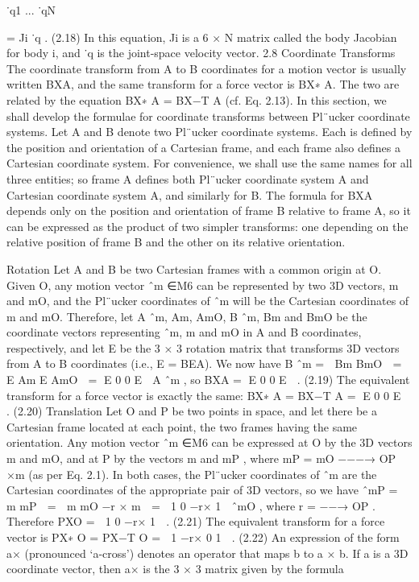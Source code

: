 ˙q1 ... ˙qN

= Ji ˙q . (2.18) In this equation, Ji is a 6 × N matrix called the body Jacobian for body i, and ˙q is the joint-space velocity vector. 2.8 Coordinate Transforms The coordinate transform from A to B coordinates for a motion vector is usually written BXA, and the same transform for a force vector is BX∗ A. The two are related by the equation BX∗ A = BX−T A (cf. Eq. 2.13). In this section, we shall develop the formulae for coordinate transforms between Pl¨ucker coordinate systems. Let A and B denote two Pl¨ucker coordinate systems. Each is defined by the position and orientation of a Cartesian frame, and each frame also defines a Cartesian coordinate system. For convenience, we shall use the same names for all three entities; so frame A defines both Pl¨ucker coordinate system A and Cartesian coordinate system A, and similarly for B. The formula for BXA depends only on the position and orientation of frame B relative to frame A, so it can be expressed as the product of two simpler transforms: one depending on the relative position of frame B and the other on its relative orientation.

Rotation Let A and B be two Cartesian frames with a common origin at O. Given O, any motion vector ˆm ∈M6 can be represented by two 3D vectors, m and mO, and the Pl¨ucker coordinates of ˆm will be the Cartesian coordinates of m and mO. Therefore, let A ˆm, Am, AmO, B ˆm, Bm and BmO be the coordinate vectors representing ˆm, m and mO in A and B coordinates, respectively, and let E be the 3 × 3 rotation matrix that transforms 3D vectors from A to B coordinates (i.e., E = BEA). We now have B ˆm =  Bm BmO  =  E Am E AmO  = E 0 0 E  A ˆm , so BXA = E 0 0 E  . (2.19) The equivalent transform for a force vector is exactly the same: BX∗ A = BX−T A = E 0 0 E  . (2.20) Translation Let O and P be two points in space, and let there be a Cartesian frame located at each point, the two frames having the same orientation. Any motion vector ˆm ∈M6 can be expressed at O by the 3D vectors m and mO, and at P by the vectors m and mP , where mP = mO −−−→ OP ×m (as per Eq. 2.1). In both cases, the Pl¨ucker coordinates of ˆm are the Cartesian coordinates of the appropriate pair of 3D vectors, so we have ˆmP =  m mP  =  m mO −r × m  =  1 0 −r× 1  ˆmO , where r = −−→ OP . Therefore PXO =  1 0 −r× 1  . (2.21) The equivalent transform for a force vector is PX∗ O = PX−T O =  1 −r× 0 1  . (2.22) An expression of the form a× (pronounced ‘a-cross’) denotes an operator that maps b to a × b. If a is a 3D coordinate vector, then a× is the 3 × 3 matrix given by the formula

